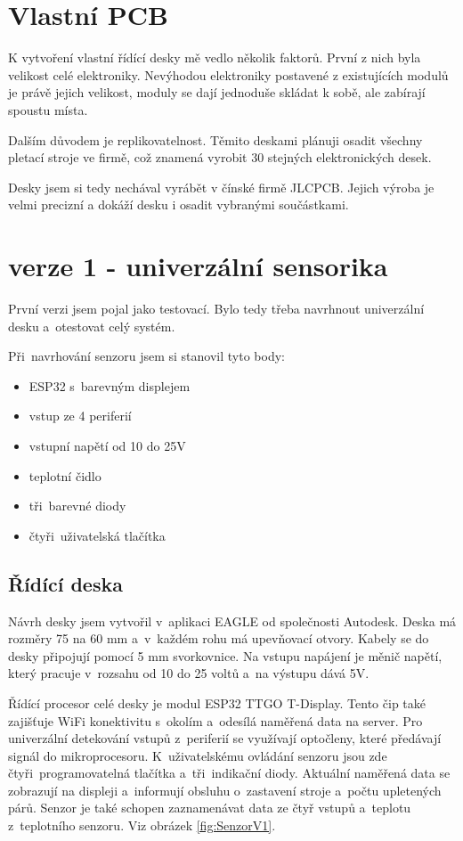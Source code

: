 \section{Vlastní PCB}
K vytvoření vlastní řídící desky mě vedlo několik faktorů. První z nich byla velikost celé elektroniky. 
Nevýhodou elektroniky postavené z existujících modulů je právě jejich velikost, moduly se dají jednoduše skládat k sobě, ale zabírají spoustu místa. 
 
Dalším důvodem je replikovatelnost. Těmito deskami plánuji osadit všechny pletací stroje ve firmě, což znamená vyrobit 30 stejných elektronických desek.

Desky jsem si tedy nechával vyrábět v čínské firmě JLCPCB. Jejich výroba je velmi precizní a dokáží desku i osadit vybranými součástkami.



\section{verze 1 - univerzální sensorika}

První verzi jsem pojal jako testovací. Bylo tedy třeba navrhnout univerzální desku a~otestovat celý systém.\newline

Při~navrhování senzoru jsem si stanovil tyto body:
\begin{itemize}
    \item ESP32 s~barevným displejem
    \item vstup ze 4 periferií
    \item vstupní napětí od 10 do 25V
    \item teplotní čidlo
    \item tři~barevné diody
    \item čtyři~uživatelská tlačítka
\end{itemize}


\subsection{Řídící deska}
Návrh desky jsem vytvořil v~aplikaci EAGLE od společnosti Autodesk. 
Deska má rozměry 75 na 60 mm a~v~každém rohu má upevňovací otvory.
Kabely se do desky připojují pomocí 5 mm svorkovnice.
Na vstupu napájení je měnič napětí, který pracuje v~rozsahu od 10 do 25 voltů a~na výstupu dává 5V. 

Řídící procesor celé desky je modul ESP32 TTGO T-Display.
Tento čip také zajišťuje WiFi konektivitu s~okolím a~odesílá naměřená data na server.
Pro univerzální detekování vstupů z~periferií se využívají optočleny, které předávají signál do mikroprocesoru.
K~uživatelskému ovládání senzoru jsou zde čtyři~programovatelná tlačítka a~tři~indikační diody.
Aktuální naměřená data se zobrazují na displeji a~informují obsluhu o~zastavení stroje a~počtu upletených párů.
Senzor je také schopen zaznamenávat data ze čtyř vstupů a~teplotu z~teplotního senzoru. Viz obrázek \ref{fig:SenzorV1}.


